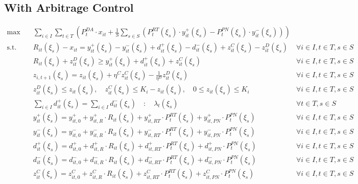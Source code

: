 \documentclass[10pt]{article}
\begin{document}
\subsection{With Arbitrage Control}
\begin{subequations}
    \begin{align}
        \text{max} \quad &\sum_{i\in I}\sum_{t\in T}\left(P_t^{DA} \cdot x_{it} + \frac{1}{S}\sum_{s \in S}\left(P_t^{RT}(\xi_s) \cdot y^+_{it}(\xi_s) - P_t^{PN}(\xi_s) \cdot y^-_{it}(\xi_s)\right) \right) \\   
        \text{s.t.} \quad 
        & R_{it}(\xi_s) - x_{it} = y_{it}^{+}(\xi_s) - y_{it}^{-}(\xi_s) + d^+_{it}(\xi_s) - d^-_{it}(\xi_s) + z^C_{it}(\xi_s) - z^D_{it}(\xi_s) & \forall i \in I, t \in T, s \in S \\
        & R_{it}(\xi_s) + z^D_{it}(\xi_s) \geq y^+_{it}(\xi_s) + d^+_{it}(\xi_s) + z^C_{it}(\xi_s) & \forall i \in I, t \in T, s \in S \\
        & z_{i,t+1}(\xi_s) = z_{it}(\xi_s) + \eta^C z^C_{it}(\xi_s) - \frac{1}{\eta^D} z^D_{it}(\xi_s) & \forall i \in I, t \in T, s \in S \\
        & z^D_{it}(\xi_s) \le z_{it}(\xi_s), \quad z^C_{it}(\xi_s) \le K_i - z_{it}(\xi_s), \quad 0 \leq z_{it}(\xi_s) \leq K_i & \forall i \in I, t \in T, s \in S \\
        & \sum_{i \in I} d^+_{it}(\xi_s) = \sum_{i \in I} d^-_{it}(\xi_s) \quad : \quad \lambda_t(\xi_s) & \forall t \in T, s \in S \\
        & y^+_{it}(\xi_s) = y^+_{it,0} + y^+_{it,R} \cdot R_{it}(\xi_s) + y^+_{it,RT} \cdot P^{RT}_t(\xi_s) + y^+_{it,PN} \cdot P^{PN}_t(\xi_s) & \forall i \in I, t \in T, s \in S \\
        & y^-_{it}(\xi_s) = y^-_{it,0} + y^-_{it,R} \cdot R_{it}(\xi_s) + y^-_{it,RT} \cdot P^{RT}_t(\xi_s) + y^-_{it,PN} \cdot P^{PN}_t(\xi_s) & \forall i \in I, t \in T, s \in S \\
        & d^+_{it}(\xi_s) = d^+_{it,0} + d^+_{it,R} \cdot R_{it}(\xi_s) + d^+_{it,RT} \cdot P^{RT}_t(\xi_s) + d^+_{it,PN} \cdot P^{PN}_t(\xi_s) & \forall i \in I, t \in T, s \in S \\
        & d^-_{it}(\xi_s) = d^-_{it,0} + d^-_{it,R} \cdot R_{it}(\xi_s) + d^-_{it,RT} \cdot P^{RT}_t(\xi_s) + d^-_{it,PN} \cdot P^{PN}_t(\xi_s) & \forall i \in I, t \in T, s \in S \\
        & z^C_{it}(\xi_s) = z^C_{it,0} + z^C_{it,R} \cdot R_{it}(\xi_s) + z^C_{it,RT} \cdot P^{RT}_t(\xi_s) + z^C_{it,PN} \cdot P^{PN}_t(\xi_s) & \forall i \in I, t \in T, s \in S \\

\end{align}
\end{subequations}
\end{document}
